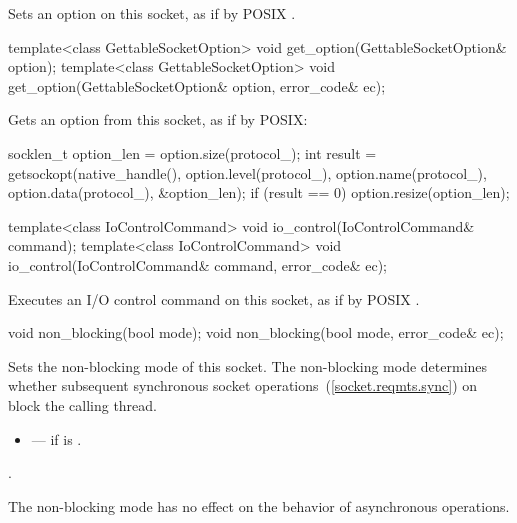 \begin{itemdescr}
\pnum
\effects Sets an option on this socket, as if by POSIX .
\end{itemdescr}

\begin{itemdecl}
template<class GettableSocketOption>
  void get_option(GettableSocketOption& option);
template<class GettableSocketOption>
  void get_option(GettableSocketOption& option, error_code& ec);
\end{itemdecl}

\begin{itemdescr}
\pnum
\effects Gets an option from this socket, as if by POSIX: 
\begin{codeblock}
socklen_t option_len = option.size(protocol_);
int result = getsockopt(native_handle(), option.level(protocol_),
                        option.name(protocol_), option.data(protocol_),
                        &option_len);
if (result == 0)
  option.resize(option_len);
\end{codeblock}

\end{itemdescr}

\begin{itemdecl}
template<class IoControlCommand>
  void io_control(IoControlCommand& command);
template<class IoControlCommand>
  void io_control(IoControlCommand& command, error_code& ec);
\end{itemdecl}

\begin{itemdescr}
\pnum
\effects Executes an I/O control command on this socket, as if by POSIX .
\end{itemdescr}

\begin{itemdecl}
void non_blocking(bool mode);
void non_blocking(bool mode, error_code& ec);
\end{itemdecl}

\begin{itemdescr}
\pnum
\effects Sets the non-blocking mode of this socket. The non-blocking mode determines whether subsequent synchronous socket operations~(\ref{socket.reqmts.sync}) on  block the calling thread.

\pnum
\errors
\begin{itemize}
\item
{} --- if  is .
\end{itemize}

\pnum
\postconditions {}.

\pnum
 \enternote The non-blocking mode has no effect on the behavior of asynchronous operations. \exitnote
\end{itemdescr}

